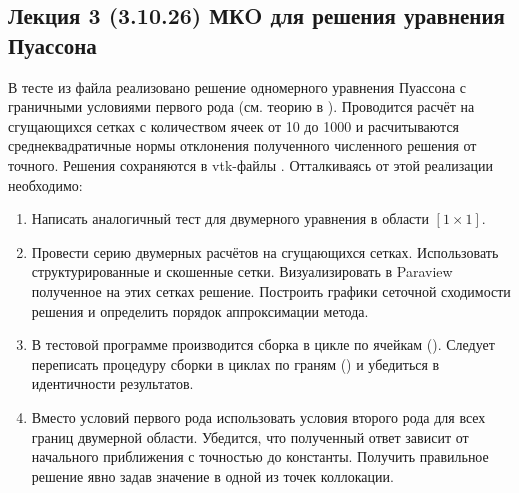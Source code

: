 \subsection{Лекция 3 (3.10.26) МКO для решения уравнения Пуассона}
В тесте  из файла 
реализовано решение одномерного уравнения Пуассона с граничными условиями первого рода
(см. теорию в ).
Проводится расчёт на сгущающихся сетках с количеством ячеек от 10 до 1000
и расчитываются среднеквадратичные нормы отклонения полученного численного решения от точного.
Решения сохраняются в vtk-файлы .
Отталкиваясь от этой реализации необходимо:
\begin{enumerate}

\item Написать аналогичный тест для двумерного уравнения в области $[1\times1]$.

\item Провести серию двумерных расчётов на сгущающихся сетках. Использовать структурированные и скошенные сетки.
      Визуализировать в Paraview полученное на этих сетках решение.
      Построить графики сеточной сходимости решения и определить порядок аппроксимации метода.

\item В тестовой программе производится сборка в цикле по ячейкам ().
      Следует переписать процедуру сборки в циклах по граням () и убедиться
      в идентичности результатов.

\item Вместо условий первого рода использовать условия второго рода для всех границ двумерной области.
      Убедится, что полученный ответ зависит от начального приближения с точностью до константы.
      Получить правильное решение явно задав значение в одной из точек коллокации.
\end{enumerate}

